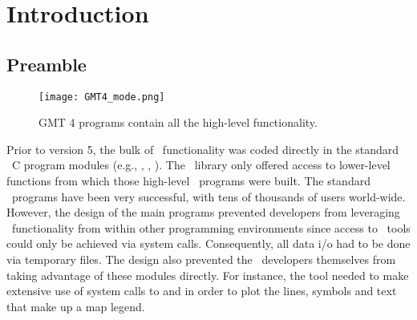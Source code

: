 \documentclass{report}
\begin{document}

\clearpage

\thispagestyle{headings}

\tableofcontents 
\thispagestyle{headings}

\chapter{Introduction} 
\thispagestyle{headings}

\section{Preamble}

\begin{figure}[h]
	\centering
	\texttt{[image: GMT4\_mode.png]}
	\caption{GMT 4 programs contain all the high-level functionality.}
\end{figure}
Prior to version 5, the bulk of \GMT\ functionality was coded directly
in the standard \GMT\ C program modules (e.g., , , ).
The \GMT\ library only offered access to lower-level functions from which those
high-level \GMT\ programs were built.  The standard \GMT\ programs have been very successful,
with tens of thousands of users world-wide.  However, the design of the main programs
prevented developers from leveraging \GMT\ functionality from within other
programming environments since access to \GMT\ tools could only be achieved
via system calls.  Consequently, all data i/o had to be done via temporary files.
The design also prevented the \GMT\ developers themselves from taking advantage of these
modules directly.  For instance, the tool  needed to make extensive use of system calls
to  and  in order to plot the lines, symbols and text
that make up a map legend.
\end{document}
